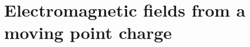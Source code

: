 \documentclass[12pt]{article}
\renewcommand{\vec}[1]{\boldsymbol{#1}}
\newcommand{\abs}[1]{\left| #1 \right|}
\begin{document}


\section{Electromagnetic fields from a moving point charge}
\end{document}
